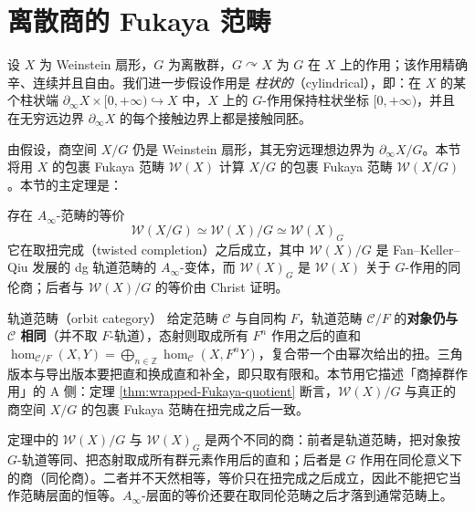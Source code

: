 \section{离散商的 Fukaya 范畴\label{sec:Fukaya-category-discrete-quotient}}
设 $X$ 为 Weinstein 扇形，$G$ 为离散群，$G\curvearrowright X$ 为 $G$ 在 $X$ 上的作用；该作用精确辛、连续并且自由。我们进一步假设作用是 \emph{柱状的}（cylindrical），即：在 $X$ 的某个柱状端 $\partial_{\infty}X\times [0,+\infty)\hookrightarrow X$ 中，$X$ 上的 $G$-作用保持柱状坐标 $[0,+\infty)$，并且在无穷远边界 $\partial_{\infty} X$ 的每个接触边界上都是接触同胚。\par

由假设，商空间 $X/G$ 仍是 Weinstein 扇形，其无穷远理想边界为 $\partial_{\infty} X/G$。本节将用 $X$ 的包裹 Fukaya 范畴 $\mathcal{W} (X)$ 计算 $X/G$ 的包裹 Fukaya 范畴 $\mathcal{W} (X/G)$。本节的主定理是：

\begin{thm}\label{thm:wrapped-Fukaya-quotient}
    存在 $A_{\infty}$-范畴的等价
    \[
        \mathcal{W} (X/G)\simeq\mathcal{W} (X)/G \simeq\mathcal{W}(X)_G
    \]
    它在取扭完成（twisted completion）之后成立，其中 $\mathcal{W} (X)/G$ 是 Fan--Keller--Qiu \cite{FKQ24} 发展的 dg 轨道范畴的 $A_{\infty}$-变体，而 $\mathcal{W}(X)_G$ 是 $\mathcal{W}(X)$ 关于 $G$-作用的同伦商；后者与 $\mathcal{W}(X)/G$ 的等价由 Christ \cite{Christ26} 证明。
\end{thm}

\begin{conceptbox}{轨道范畴（orbit category）}
给定范畴 $\mathcal{C}$ 与自同构 $F$，轨道范畴 $\mathcal{C}/F$ 的\textbf{对象仍与 $\mathcal{C}$ 相同}（并不取 $F$-轨道），态射则取成所有 $F^n$ 作用之后的直和 $\hom_{\mathcal{C}/F}(X,Y)=\bigoplus_{n\in\mathbb{Z}}\hom_{\mathcal{C}}(X,F^nY)$，复合带一个由幂次给出的扭。三角版本与导出版本要把直和换成直和补全，即只取有限和。本节用它描述「商掉群作用」的 A 侧：定理 \ref{thm:wrapped-Fukaya-quotient} 断言，$\mathcal{W}(X)/G$ 与真正的商空间 $X/G$ 的包裹 Fukaya 范畴在扭完成之后一致。
\par\smallskip{}
\end{conceptbox}

\begin{yizhu}[两种商不是一回事]
定理中的 $\mathcal{W} (X)/G$ 与 $\mathcal{W}(X)_G$ 是两个不同的商：前者是轨道范畴，把对象按 $G$-轨道等同、把态射取成所有群元素作用后的直和；后者是 $G$ 作用在同伦意义下的商（同伦商）。二者并不天然相等，等价只在扭完成之后成立，因此不能把它当作范畴层面的恒等。$A_{\infty}$-层面的等价还要在取同伦范畴之后才落到通常范畴上。
\end{yizhu}

